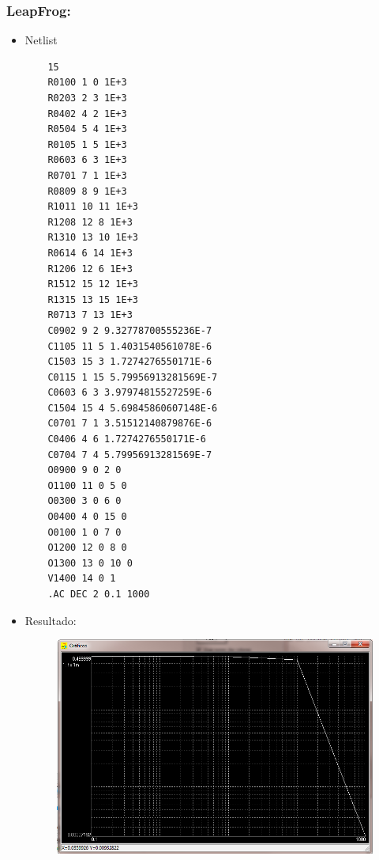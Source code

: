 \documentclass[a4paper,12pt]{article} %
\begin{document}
  \subsubsection{LeapFrog:}
  \begin{itemize}
  	\item Netlist
  	\begin{lstlisting}
  	15
  	R0100 1 0 1E+3
  	R0203 2 3 1E+3
  	R0402 4 2 1E+3
  	R0504 5 4 1E+3
  	R0105 1 5 1E+3
  	R0603 6 3 1E+3
  	R0701 7 1 1E+3
  	R0809 8 9 1E+3
  	R1011 10 11 1E+3
  	R1208 12 8 1E+3
  	R1310 13 10 1E+3
  	R0614 6 14 1E+3
  	R1206 12 6 1E+3
  	R1512 15 12 1E+3
  	R1315 13 15 1E+3
  	R0713 7 13 1E+3
  	C0902 9 2 9.32778700555236E-7
  	C1105 11 5 1.4031540561078E-6
  	C1503 15 3 1.7274276550171E-6
  	C0115 1 15 5.79956913281569E-7
  	C0603 6 3 3.97974815527259E-6
  	C1504 15 4 5.69845860607148E-6
  	C0701 7 1 3.51512140879876E-6
  	C0406 4 6 1.7274276550171E-6
  	C0704 7 4 5.79956913281569E-7
  	O0900 9 0 2 0
  	O1100 11 0 5 0
  	O0300 3 0 6 0
  	O0400 4 0 15 0
  	O0100 1 0 7 0
  	O1200 12 0 8 0
  	O1300 13 0 10 0
  	V1400 14 0 1
  	.AC DEC 2 0.1 1000
  	\end{lstlisting}
  	\item Resultado:
  	\begin{figure}[h!]
\centering
\includegraphics[width=1\linewidth]{leapfrog}

\label{Gráfico LeapFrog}
\end{figure}

  \end{itemize}
\end{document}
